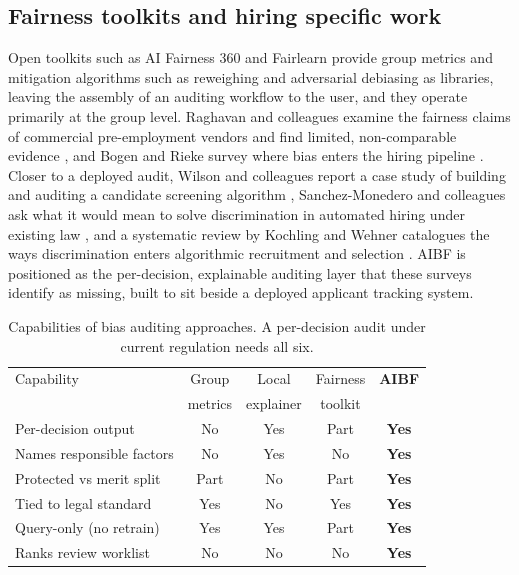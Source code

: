 \documentclass[conference]{IEEEtran}
\begin{document}
\subsection{Fairness toolkits and hiring specific work}
Open toolkits such as AI Fairness 360 \cite{aif360} and Fairlearn \cite{fairlearn}
provide group metrics and mitigation algorithms such as reweighing and adversarial debiasing \cite{zhang_adv} as libraries, leaving the assembly of
an auditing workflow to the user, and they operate primarily at the group level.
Raghavan and colleagues examine the fairness claims of commercial pre-employment
vendors and find limited, non-comparable evidence \cite{raghavan}, and Bogen and
Rieke survey where bias enters the hiring pipeline \cite{bogen}. Closer to a deployed audit, Wilson and colleagues report a case study of building and auditing a candidate screening algorithm \cite{wilson}, Sanchez-Monedero and colleagues ask what it would mean to solve discrimination in automated hiring under existing law \cite{sanchez}, and a systematic review by Kochling and Wehner catalogues the ways discrimination enters algorithmic recruitment and selection \cite{kochling}. AIBF is positioned as
the per-decision, explainable auditing layer that these surveys identify as missing,
built to sit beside a deployed applicant tracking system.

\begin{table}[t]
\caption{Capabilities of bias auditing approaches. A per-decision audit under current
regulation needs all six.}
\label{tab:capability}
\centering
\footnotesize
\begin{tabular}{@{}lcccc@{}}
\toprule
Capability & Group & Local & Fairness & \textbf{AIBF} \\
 & metrics & explainer & toolkit & \\
\midrule
Per-decision output        & No  & Yes & Part & \textbf{Yes} \\
Names responsible factors  & No  & Yes & No   & \textbf{Yes} \\
Protected vs merit split   & Part& No  & Part & \textbf{Yes} \\
Tied to legal standard     & Yes & No  & Yes  & \textbf{Yes} \\
Query-only (no retrain)    & Yes & Yes & Part & \textbf{Yes} \\
Ranks review worklist      & No  & No  & No   & \textbf{Yes} \\
\bottomrule
\end{tabular}
\end{table}
\end{document}
